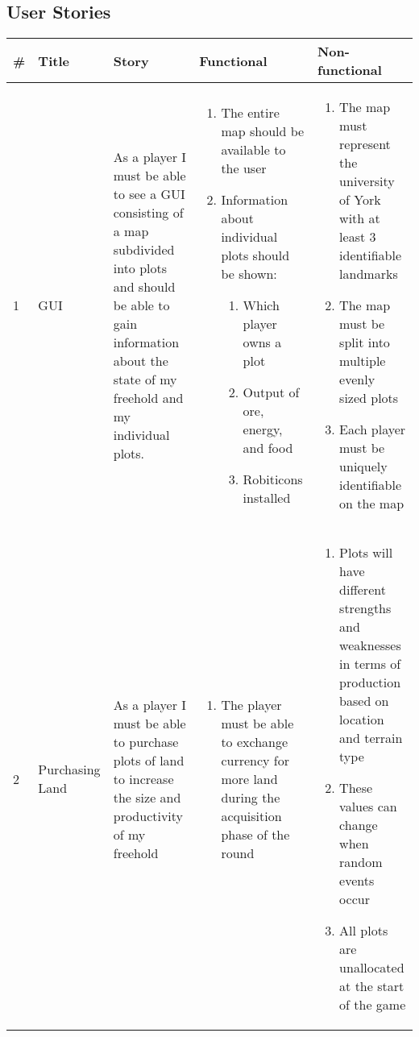 \begin{landscape}
	\section{User Stories}
	\begin{longtable}{|l||l|p{4cm}|p{8cm}|p{7cm}|}
		\hline
		\# & Title & Story & Functional & Non-functional \\ \hline \hline \endhead
		1 & GUI & As a player I must be able to see a GUI consisting of a map subdivided into plots and should be able to gain information about the state of my freehold and my individual plots.
		& \begin{enumerate}[label=1.1.\arabic*.]
			\item The entire map should be available to the user
			\item Information about individual plots should be shown:
			\begin{enumerate}
				\item Which player owns a plot
				\item Output of ore, energy, and food
				\item Robiticons installed
			\end{enumerate}
		\end{enumerate}
		& \begin{enumerate}[label=1.2.\arabic*.]
			\item The map must represent the university of York with at least 3 identifiable landmarks
			\item The map must be split into multiple evenly sized plots
			\item Each player must be uniquely identifiable on the map
		\end{enumerate} \\ \hline
	
	2 & Purchasing Land
	& As a player I must be able to purchase plots of land to increase the size and productivity of my freehold
	& \begin{enumerate}[label=2.1.\arabic*.]
		\item The player must be able to exchange currency for more land during the acquisition phase of the round
	\end{enumerate}
	& \begin{enumerate}[label=2.2.\arabic*.]
		\item Plots will have different strengths and weaknesses in terms of production based on location and terrain type
		\item These values can change when random events occur
		\item All plots are unallocated at the start of the game
	\end{enumerate} \\ \hline


\end{longtable}
\end{landscape}
